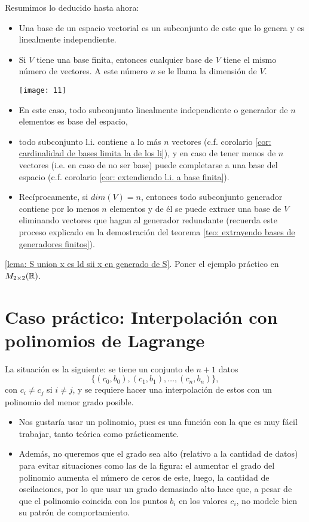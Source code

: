 Resumimos lo deducido hasta ahora:
\begin{itemize}
	\item Una base de un espacio vectorial es un subconjunto de este
	que lo genera y es linealmente independiente.
	\item Si $V$ tiene una base finita, entonces cualquier base de $V$
	tiene el mismo número de vectores. A este número $n$ se le llama la 
	dimensión de $V$.
	\begin{marginfigure}
		\texttt{[image: 11]}
	\end{marginfigure}
	\item En este caso, todo subconjunto linealmente independiente
	o generador de $n$ elementos es base del espacio,
	\item todo subconjunto l.i. contiene a lo más $n$
	vectores (c.f. corolario
	\ref{cor: cardinalidad de bases limita la de los li}),
	y en caso de tener menos de $n$ vectores (i.e. en caso de no ser base)
	puede completarse a una base
	del espacio (c.f. corolario 
	\ref{cor: extendiendo l.i. a base finita}).
	\item Recíprocamente, si $dim(V) = n$, entonces todo subconjunto
	generador contiene por lo menos $n$ elementos
	y de él se puede extraer una base de $V$ eliminando vectores
	que hagan al generador redundante (recuerda este proceso explicado
	en la demostración del teorema 
	\ref{teo: extrayendo bases de generadores finitos}).

\end{itemize}

\ref{lema: S union x es ld sii x en generado de S}. Poner el ejemplo
práctico en $M_{2 \times 2}(\mathbb{R})$.

\section{Caso práctico: Interpolación con polinomios de Lagrange}


La situación es la siguiente: se tiene un conjunto de $n+1$ datos
\[
\{ (c_{0}, b_{0}), (c_{1}, b_{1}), \ldots , (c_{n}, b_{n}) \},
\]
con $c_{i} \neq c_{j}$ si $i \neq j$, y se requiere
hacer una interpolación de estos con un polinomio
del menor grado posible. 
\begin{itemize}
	\item Nos gustaría usar un polinomio, pues es una función
	con la que es muy fácil trabajar, tanto teórica
	como prácticamente.
	\item Además, no queremos que el grado sea alto 
	(relativo a la cantidad de datos) para evitar situaciones
	como las de la figura: el aumentar el grado del polinomio
	aumenta el número de ceros de este, luego, la cantidad de
	oscilaciones, por lo que usar un grado demasiado alto hace
	que, a pesar de que el polinomio coincida con los puntos
	$b_{i}$ en los valores $c_{i}$, no modele bien su patrón
	de comportamiento.
\end{itemize}

